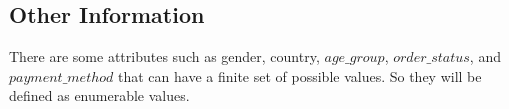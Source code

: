 
\subsection{Other Information}


There are some attributes such as gender, country, $age\_group$, $order\_status$, and $payment\_method$ that can have a finite set of possible values. So they will be defined as enumerable values.